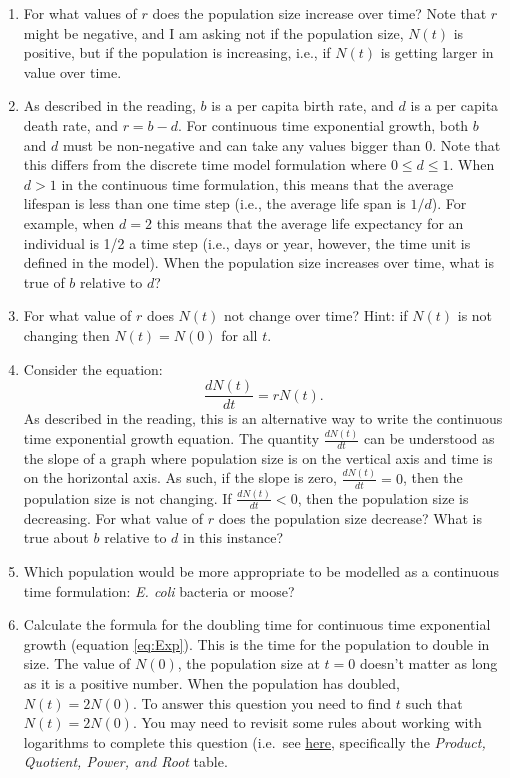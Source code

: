 \documentclass[
]{book}
\begin{document}
\begin{enumerate}
\def\labelenumi{\arabic{enumi}.}
\item
  For what values of \(r\) does the population size increase over time? Note that \(r\) might be negative, and I am asking not if the population size, \(N(t)\) is positive, but if the population is increasing, i.e., if \(N(t)\) is getting larger in value over time.
\item
  As described in the reading, \(b\) is a per capita birth rate, and \(d\) is a per capita death rate, and \(r = b-d\). For continuous time exponential growth, both \(b\) and \(d\) must be non-negative and can take any values bigger than 0. Note that this differs from the discrete time model formulation where \(0 \leq d \leq 1\). When \(d > 1\) in the continuous time formulation, this means that the average lifespan is less than one time step (i.e., the average life span is \(1/d\)). For example, when \(d = 2\) this means that the average life expectancy for an individual is 1/2 a time step (i.e., days or year, however, the time unit is defined in the model). When the population size increases over time, what is true of \(b\) relative to \(d\)?
\item
  For what value of \(r\) does \(N(t)\) not change over time? Hint: if \(N(t)\) is not changing then \(N(t)=N(0)\) for all \(t\).
\item
  Consider the equation:
  \[
  \frac{dN(t)}{dt} = rN(t).
  \]
  As described in the reading, this is an alternative way to write the continuous time exponential growth equation. The quantity \(\frac{dN(t)}{dt}\) can be understood as the slope of a graph where population size is on the vertical axis and time is on the horizontal axis. As such, if the slope is zero, \(\frac{dN(t)}{dt}=0\), then the population size is not changing. If \(\frac{dN(t)}{dt}<0\), then the population size is decreasing. For what value of \(r\) does the population size decrease? What is true about \(b\) relative to \(d\) in this instance?
\item
  Which population would be more appropriate to be modelled as a continuous time formulation: \emph{E. coli} bacteria or moose?
\item
  Calculate the formula for the doubling time for continuous time exponential growth (equation \eqref{eq:Exp}). This is the time for the population to double in size. The value of \(N(0)\), the population size at \(t=0\) doesn't matter as long as it is a positive number. When the population has doubled, \(N(t) = 2N(0)\). To answer this question you need to find \(t\) such that \(N(t) = 2N(0)\). You may need to revisit some rules about working with logarithms to complete this question (i.e.~see \href{https://en.wikipedia.org/wiki/Logarithm}{here}, specifically the \emph{Product, Quotient, Power, and Root} table.
\end{enumerate}
\end{document}
